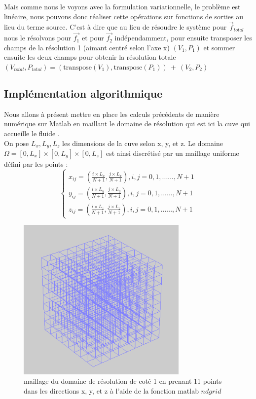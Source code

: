 \documentclass[a4paper,12pt,titlepage]{report}
\begin{document}
\begin{onehalfspace}
Mais comme nous le voyons avec la formulation variationnelle, le problème est linéaire, nous pouvons donc réaliser cette opérations sur fonctions de sorties au lieu du terme source.
C'est à dire que au lieu de résoudre le système pour $\vec{f}_{total}$ nous le résolvons pour $\vec{f_1}$ et pour $\vec{f_2}$ indépendamment, pour ensuite 
transposer les champs de la résolution 1 (aimant centré selon l'axe x) $(V_1, P_1)$ et sommer ensuite les deux champs pour obtenir la 
résolution totale \\
$(V_{total}, P_{total}) = (\text{transpose}(V_1), \text{transpose}(P_1))\ +\ (V_2, P_2)$
\newpage
\subsection{Implémentation algorithmique}

Nous allons à présent mettre en place les calculs précédents de manière numérique sur Matlab en maillant le domaine de résolution qui est ici la cuve qui accueille le fluide .  
\\ 
On pose $ L_x,  L_y,  L_z$ les dimensions de la cuve selon x, y, et z.
\newline
Le domaine $\Omega = [0, L_x]\times[0, L_y]\times[0, L_z]$ est ainsi discrétisé par un maillage uniforme défini par les points : 
\\

\[
\left\{
\begin{array}{ccc}
  x_{ij} = (\frac{i\times L_x}{N+1} ,\frac{j\times L_x}{N+1}),    i,j=0,1,......,N+1\\
  y_{ij} = (\frac{i\times L_y}{N+1} ,\frac{j\times L_y}{N+1}),    i,j=0,1,......,N+1  \\
 z_{ij} = (\frac{i\times L_z}{N+1} ,\frac{j\times L_z}{N+1}),    i,j=0,1,......,N+1  
\end{array}
\right.
\]
\begin{figure}[!h]
	\begin{center}
	\centering
		\includegraphics[height = 8cm, keepaspectratio]{graphes/maillage_droit.png} 
		\caption{maillage du domaine de résolution de coté 1 en prenant 11 points dans les directions x, y, et z à l'aide de la fonction matlab $ndgrid$}
	\end{center}
\end{figure}


\end{onehalfspace}
\end{document}
